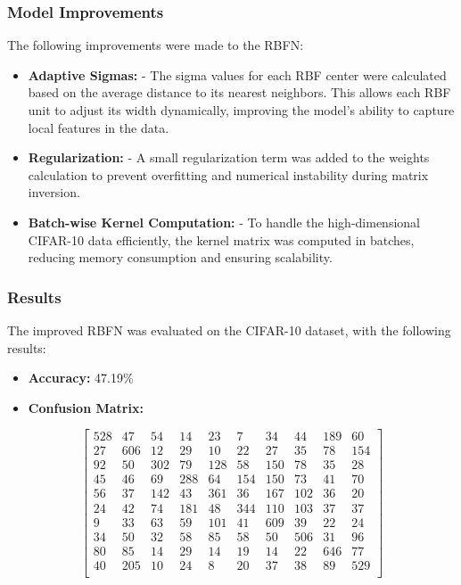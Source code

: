 \documentclass[lettersize,journal]{IEEEtran}
\begin{document}
\subsubsection{\textbf{Model Improvements}}
The following improvements were made to the RBFN:
\begin{itemize}
    \item \textbf{Adaptive Sigmas:} 
    - The sigma values for each RBF center were calculated based on the average distance to its nearest neighbors. This allows each RBF unit to adjust its width dynamically, improving the model's ability to capture local features in the data.
    \item \textbf{Regularization:} 
    - A small regularization term was added to the weights calculation to prevent overfitting and numerical instability during matrix inversion.
    \item \textbf{Batch-wise Kernel Computation:} 
    - To handle the high-dimensional CIFAR-10 data efficiently, the kernel matrix was computed in batches, reducing memory consumption and ensuring scalability.
\end{itemize}

\subsubsection{\textbf{Results}}
The improved RBFN was evaluated on the CIFAR-10 dataset, with the following results:

\begin{itemize}
    \item \textbf{Accuracy:} 47.19\%
    \item \textbf{Confusion Matrix:}
\end{itemize}

\begin{scriptsize}
\[
\begin{bmatrix}
528 & 47 & 54 & 14 & 23 & 7 & 34 & 44 & 189 & 60 \\
27 & 606 & 12 & 29 & 10 & 22 & 27 & 35 & 78 & 154 \\
92 & 50 & 302 & 79 & 128 & 58 & 150 & 78 & 35 & 28 \\
45 & 46 & 69 & 288 & 64 & 154 & 150 & 73 & 41 & 70 \\
56 & 37 & 142 & 43 & 361 & 36 & 167 & 102 & 36 & 20 \\
24 & 42 & 74 & 181 & 48 & 344 & 110 & 103 & 37 & 37 \\
9 & 33 & 63 & 59 & 101 & 41 & 609 & 39 & 22 & 24 \\
34 & 50 & 32 & 58 & 85 & 58 & 50 & 506 & 31 & 96 \\
80 & 85 & 14 & 29 & 14 & 19 & 14 & 22 & 646 & 77 \\
40 & 205 & 10 & 24 & 8 & 20 & 37 & 38 & 89 & 529 \\
\end{bmatrix}
\]
\end{scriptsize}
\end{document}
